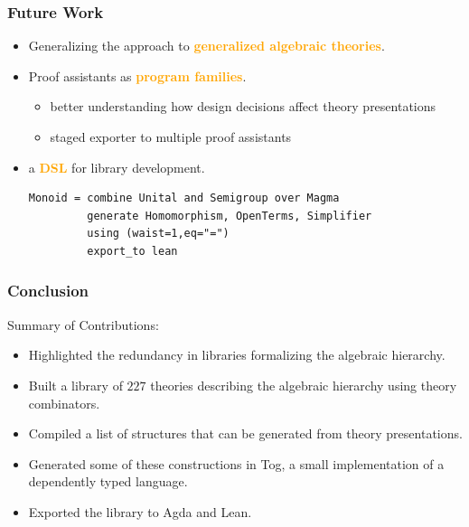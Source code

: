 \documentclass[t,10pt,numbers,fleqn,usenames,xcolor=dvipsnames]{beamer}
\begin{document}
\begin{frame}[fragile] 
\frametitle{Future Work}
\begin{itemize}
\item Generalizing the approach to \textcolor{Orange}{\textbf{generalized algebraic theories}}.
\pause
\vspace{0.5cm}
\item Proof assistants as \textcolor{Orange}{\textbf{program families}}. 
\begin{itemize}
\item better understanding how design decisions affect theory presentations 
\item staged exporter to multiple proof assistants 
\end{itemize}
\pause
\vspace{0.5cm}
\item a \textcolor{Orange}{\textbf{DSL}} for library development. 
\vspace{0.2cm}
\begin{verbatim}
Monoid = combine Unital and Semigroup over Magma
         generate Homomorphism, OpenTerms, Simplifier
         using (waist=1,eq="=")
         export_to lean
\end{verbatim}
\end{itemize}
\end{frame} 

\begin{frame}[fragile] 
\frametitle{Conclusion} 
Summary of Contributions: 
\begin{itemize}
\item Highlighted the redundancy in libraries formalizing the algebraic hierarchy.
\item Built a library of $227$ theories describing the algebraic hierarchy using theory combinators.
\item Compiled a list of structures that can be generated from theory presentations.
\item Generated some of these constructions in Tog, a small implementation of a dependently typed language.
\item Exported the library to Agda and Lean.
\end{itemize}
\end{frame}
\end{document}
